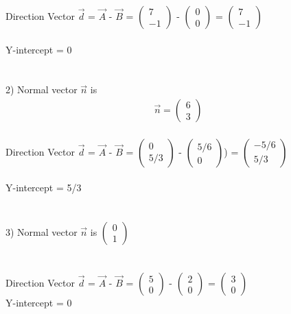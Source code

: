 \documentclass[journal,12pt,twocolumn]{IEEEtran}
\newcommand{\myvec}[1]{\ensuremath{\begin{pmatrix}#1\end{pmatrix}}}
\begin{document}
Direction Vector $\vec{d}$ = $\vec{A}$ - $\vec{B}$ = \myvec{ 7 \\ -1 } - \myvec{ 0 \\ 0 } = \myvec{ 7 \\ -1 }
\\
\\
Y-intercept = 0
\\
\\
\\
2) Normal vector $\vec{n}$ is \begin{align}
	\vec{n} = \myvec{ 6 \\ 3 }
\end{align}
\\
Direction Vector $\vec{d}$ = $\vec{A}$ - $\vec{B}$ = \myvec{ 0 \\ 5/3 } - \myvec{ 5/6 \\ 0 }) = \myvec{ -5/6 \\ 5/3 }
\\
\\
Y-intercept = 5/3
\\
\\
\\
3) Normal vector $\vec{n}$ is   \myvec{ 0 \\ 1 }
\\
\\
\\
Direction Vector $\vec{d}$ = $\vec{A}$ - $\vec{B}$ = \myvec{ 5 \\ 0 } - \myvec{ 2 \\ 0 } = \myvec{ 3 \\ 0 }
\\
Y-intercept =  0
\end{document}
